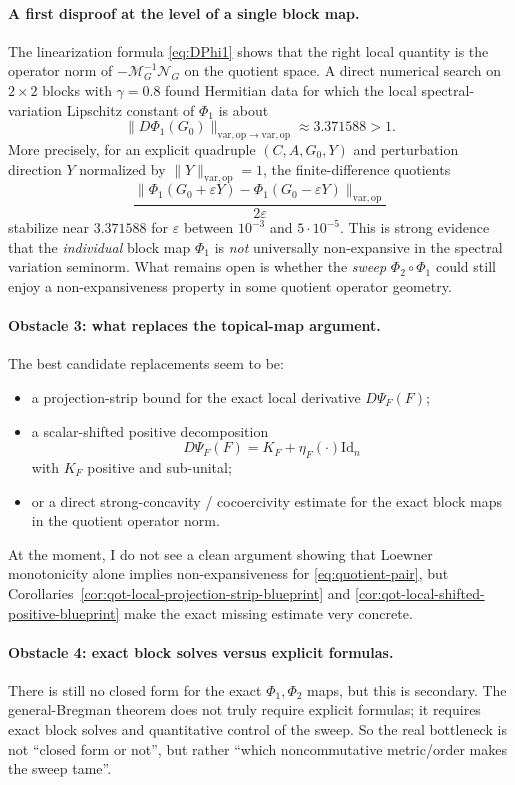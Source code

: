 \documentclass[11pt]{article}
\newcommand{\Id}{\mathrm{Id}}
\newcommand{\eps}{\varepsilon}
\newcommand{\op}{\mathrm{op}}
\newcommand{\varop}{\mathrm{var},\op}
\theoremstyle{plain}
\begin{document}
\paragraph{A first disproof at the level of a single block map.}
The linearization formula \eqref{eq:DPhi1} shows that the right local quantity is the operator norm of $-\mathcal M_G^{-1}\mathcal N_G$ on the quotient space.
A direct numerical search on $2 \times 2$ blocks with $\gamma=0.8$ found Hermitian data for which the local spectral-variation Lipschitz constant of $\Phi_1$ is about
\[
\|D\Phi_1(G_0)\|_{\varop \to \varop} \approx 3.371588 > 1.
\]
More precisely, for an explicit quadruple $(C,A,G_0,Y)$ and perturbation direction $Y$ normalized by $\|Y\|_{\varop}=1$, the finite-difference quotients
\[
\frac{\|\Phi_1(G_0+\eps Y)-\Phi_1(G_0-\eps Y)\|_{\varop}}{2\eps}
\]
stabilize near $3.371588$ for $\eps$ between $10^{-3}$ and $5 \cdot 10^{-5}$.
This is strong evidence that the \emph{individual} block map $\Phi_1$ is \emph{not} universally non-expansive in the spectral variation seminorm.
What remains open is whether the \emph{sweep} $\Phi_2 \circ \Phi_1$ could still enjoy a non-expansiveness property in some quotient operator geometry.

\paragraph{Obstacle 3: what replaces the topical-map argument.}
The best candidate replacements seem to be:
\begin{itemize}[leftmargin=1.5em]
\item a projection-strip bound for the exact local derivative $D\Psi_F(F)$;
\item a scalar-shifted positive decomposition
\[
D\Psi_F(F)=K_F+\eta_F(\cdot)\Id_n
\]
with $K_F$ positive and sub-unital;
\item or a direct strong-concavity / cocoercivity estimate for the exact block maps in the quotient operator norm.
\end{itemize}
At the moment, I do not see a clean argument showing that Loewner monotonicity alone implies non-expansiveness for \eqref{eq:quotient-pair}, but Corollaries~\ref{cor:qot-local-projection-strip-blueprint} and \ref{cor:qot-local-shifted-positive-blueprint} make the exact missing estimate very concrete.

\paragraph{Obstacle 4: exact block solves versus explicit formulas.}
There is still no closed form for the exact $\Phi_1,\Phi_2$ maps, but this is secondary.
The general-Bregman theorem does not truly require explicit formulas; it requires exact block solves and quantitative control of the sweep.
So the real bottleneck is not ``closed form or not'', but rather ``which noncommutative metric/order makes the sweep tame''.
\end{document}
